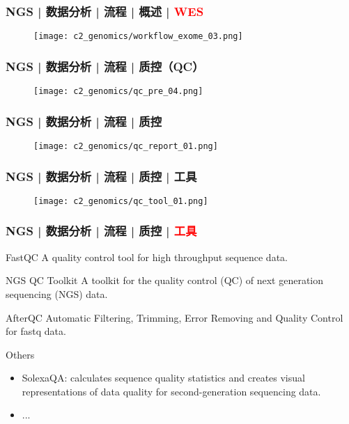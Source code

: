 \begin{frame}
  \frametitle{NGS | 数据分析 | 流程 | 概述 | \textcolor{red}{WES}}
  \begin{figure}
    \centering
    \texttt{[image: c2\_genomics/workflow\_exome\_03.png]}
  \end{figure}
\end{frame}

\begin{frame}
  \frametitle{NGS | 数据分析 | 流程 | 质控（QC）}
  \begin{figure}
    \centering
    \texttt{[image: c2\_genomics/qc\_pre\_04.png]}
  \end{figure}
\end{frame}

\begin{frame}
  \frametitle{NGS | 数据分析 | 流程 | 质控}
  \begin{figure}
    \centering
    \texttt{[image: c2\_genomics/qc\_report\_01.png]}
  \end{figure}
\end{frame}

\begin{frame}
  \frametitle{NGS | 数据分析 | 流程 | 质控 | 工具}
  \begin{figure}
    \centering
    \texttt{[image: c2\_genomics/qc\_tool\_01.png]}
  \end{figure}
\end{frame}

\begin{frame}
  \frametitle{NGS | 数据分析 | 流程 | 质控 | \textcolor{red}{工具}}
  \begin{block}{FastQC}
    A quality control tool for high throughput sequence data.
  \end{block}
  \vspace{-0.2em}
  \pause
  \begin{block}{NGS QC Toolkit}
    A toolkit for the quality control (QC) of next generation sequencing (NGS) data.
  \end{block}
  \vspace{-0.2em}
  \pause
  \begin{block}{AfterQC}
    Automatic Filtering, Trimming, Error Removing and Quality Control for fastq data.
  \end{block}
  \vspace{-0.2em}
  \pause
  \begin{block}{Others}
    \begin{itemize}
      \item SolexaQA: calculates sequence quality statistics and creates visual representations of data quality for second-generation sequencing data.
      \item ...
    \end{itemize}
  \end{block}
\end{frame}

